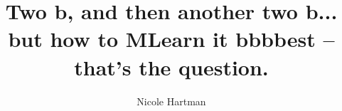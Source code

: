 \documentclass{report}
\begin{document}
\title{Two b, and then another two b... but how to MLearn it bbbbest -- that's the question.}
\author{Nicole Hartman}
 
\beforepreface


\afterpreface












\def\kvv{$\kappa_{2V}$}
\def\kv{$\kappa_V$} 









\appendix













\printbibliography
\end{document}
